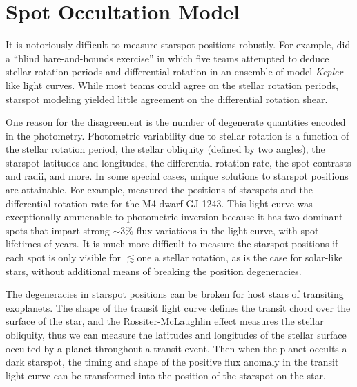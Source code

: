 \documentclass[iop]{emulateapj}
\newcommand{\kepler}{\textit{Kepler}}
\begin{document}
\section{Spot Occultation Model}


It is notoriously difficult to measure starspot positions robustly. For example, \citet{Aigrain2015} did a ``blind hare-and-hounds exercise'' in which five teams attempted to deduce stellar rotation periods and differential rotation in an ensemble of model \kepler-like light curves. While most teams could agree on the stellar rotation periods, starspot modeling yielded little agreement on the differential rotation shear. 


One reason for the disagreement is the number of degenerate quantities encoded in the photometry. Photometric variability due to stellar rotation is a function of the stellar rotation period, the stellar obliquity (defined by two angles), the starspot latitudes and longitudes, the differential rotation rate, the spot contrasts and radii, and more. In some special cases, unique solutions to starspot positions are attainable. For example, \citet{Davenport2015} measured the positions of starspots and the differential rotation rate for the M4 dwarf GJ 1243. This light curve was exceptionally ammenable to photometric inversion because it has two dominant spots that impart strong $\sim 3$\% flux variations in the light curve, with spot lifetimes of years. It is much more difficult to measure the starspot positions if each spot is only visible for $\lesssim$one a stellar rotation, as is the case for solar-like stars, without additional means of breaking the position degeneracies.

The degeneracies in starspot positions can be broken for host stars of transiting exoplanets. The shape of the transit light curve defines the transit chord over the surface of the star, and the Rossiter-McLaughlin effect measures the stellar obliquity, thus we can measure the latitudes and longitudes of the stellar surface occulted by a planet throughout a transit event. Then when the planet occults a dark starspot, the timing and shape of the positive flux anomaly in the transit light curve can be transformed into the position of the starspot on the star. 
\end{document}
